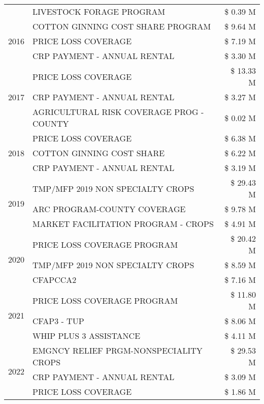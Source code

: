 \begin{tabular}{llr}
 & LIVESTOCK FORAGE PROGRAM & \$ 0.39 M \\
\cline{1-3}
\multirow[t]{3}{*}{2016} & COTTON GINNING COST SHARE PROGRAM & \$ 9.64 M \\
 & PRICE LOSS COVERAGE & \$ 7.19 M \\
 & CRP PAYMENT - ANNUAL RENTAL & \$ 3.30 M \\
\cline{1-3}
\multirow[t]{3}{*}{2017} & PRICE LOSS COVERAGE & \$ 13.33 M \\
 & CRP PAYMENT - ANNUAL RENTAL & \$ 3.27 M \\
 & AGRICULTURAL RISK COVERAGE PROG - COUNTY & \$ 0.02 M \\
\cline{1-3}
\multirow[t]{3}{*}{2018} & PRICE LOSS COVERAGE & \$ 6.38 M \\
 & COTTON GINNING COST SHARE & \$ 6.22 M \\
 & CRP PAYMENT - ANNUAL RENTAL & \$ 3.19 M \\
\cline{1-3}
\multirow[t]{3}{*}{2019} & TMP/MFP 2019 NON SPECIALTY CROPS & \$ 29.43 M \\
 & ARC PROGRAM-COUNTY COVERAGE & \$ 9.78 M \\
 & MARKET FACILITATION PROGRAM - CROPS & \$ 4.91 M \\
\cline{1-3}
\multirow[t]{3}{*}{2020} & PRICE LOSS COVERAGE PROGRAM & \$ 20.42 M \\
 & TMP/MFP 2019 NON SPECIALTY CROPS & \$ 8.59 M \\
 & CFAPCCA2 & \$ 7.16 M \\
\cline{1-3}
\multirow[t]{3}{*}{2021} & PRICE LOSS COVERAGE PROGRAM & \$ 11.80 M \\
 & CFAP3 - TUP & \$ 8.06 M \\
 & WHIP PLUS 3 ASSISTANCE & \$ 4.11 M \\
\cline{1-3}
\multirow[t]{3}{*}{2022} & EMGNCY RELIEF PRGM-NONSPECIALITY CROPS & \$ 29.53 M \\
 & CRP PAYMENT - ANNUAL RENTAL & \$ 3.09 M \\
 & PRICE LOSS COVERAGE & \$ 1.86 M \\
\cline{1-3}
\bottomrule
\end{tabular}

